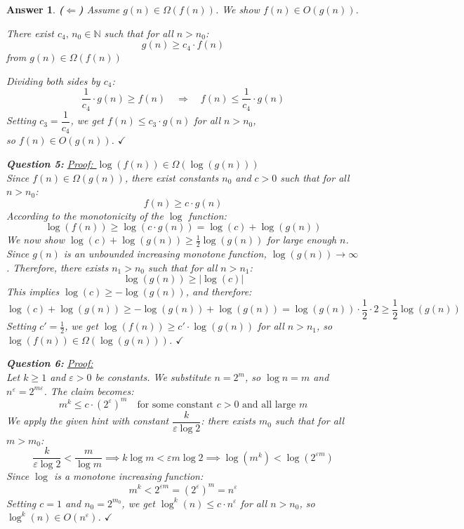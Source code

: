 \documentclass[a4paper]{article}
\theoremstyle{remarksStyle}
\theoremstyle{questionStyle}
\theoremstyle{answerStyle}
\newtheorem{answer}{Answer}
\begin{document}
\begin{answer}
\bigskip
\noindent\textbf{($\Leftarrow$)} Assume $g(n) \in \Omega(f(n))$. We show $f(n) \in O(g(n))$.
 
There exist $c_4,\, n_0 \in \mathbb{N}$ such that for all $n > n_0$:
\[g(n) \geq c_4 \cdot f(n)\]
from $g(n) \in \Omega(f(n))$

Dividing both sides by $c_4$:
\[
    \frac{1}{c_4} \cdot g(n) \geq f(n)
    \quad\Longrightarrow\quad
    f(n) \leq \frac{1}{c_4} \cdot g(n)
\]
Setting $c_3 = \dfrac{1}{c_4}$, we get $f(n) \leq c_3 \cdot g(n)$ for all $n > n_0$, \\
so $f(n) \in O(g(n))$. $\checkmark$ \\

\bigskip

\textbf{Question 5:}
\noindent\underline{Proof: $\log(f(n)) \in \Omega(\log(g(n)))$}\\
Since $f(n) \in \Omega(g(n))$, there exist constants $n_0$ and $c > 0$ such that for all $n > n_0$:
\[
f(n) \ge c \cdot g(n)
\]
According to the monotonicity of the $\log$ function:
\[
\log(f(n)) \ge \log(c \cdot g(n)) = \log(c) + \log(g(n))
\]
\medskip
We now show $\log(c) + \log(g(n)) \geq \frac{1}{2}\log(g(n))$ for large enough $n$.
Since $g(n)$ is an unbounded increasing monotone function, $\log(g(n)) \to \infty$.
Therefore, there exists $n_1 > n_0$ such that for all $n > n_1$:
\[
\log(g(n)) \geq |\log(c)|
\]
This implies $\log(c) \geq -\log(g(n))$, and therefore:
\[
\log(c) + \log(g(n)) \geq -\log(g(n)) + \log(g(n)) = \log(g(n)) \cdot \frac{1}{2} \cdot 2 \geq \frac{1}{2}\log(g(n))
\]
Setting $c' = \frac{1}{2}$, we get $\log(f(n)) \geq c' \cdot \log(g(n))$ for all $n > n_1$,
so $\log(f(n)) \in \Omega(\log(g(n)))$. $\checkmark$ \\

\bigskip

\textbf{Question 6:}
\noindent\underline{Proof:}\\
Let $k \geq 1$ and $\varepsilon > 0$ be constants.
We substitute $n = 2^m$, so $\log n = m$ and $n^\varepsilon = 2^{m\varepsilon}$.
The claim becomes:
\[
m^k \leq c \cdot (2^\varepsilon)^m \quad \text{for some constant } c > 0 \text{ and all large } m
\]
We apply the given hint with constant $\dfrac{k}{\varepsilon \log 2}$:
there exists $m_0$ such that for all $m > m_0$:
\[
\frac{k}{\varepsilon \log 2} < \frac{m}{\log m}
\implies k \log m < \varepsilon m \log 2
\implies \log(m^k) < \log(2^{\varepsilon m})
\]
Since $\log$ is a monotone increasing function:
\[
m^k < 2^{\varepsilon m} = (2^\varepsilon)^m = n^\varepsilon
\]
Setting $c = 1$ and $n_0 = 2^{m_0}$, we get $\log^k(n) \leq c \cdot n^\varepsilon$ for all $n > n_0$,
so $\log^k(n) \in O(n^\varepsilon)$. $\checkmark$ \\


\end{answer}
\end{document}
